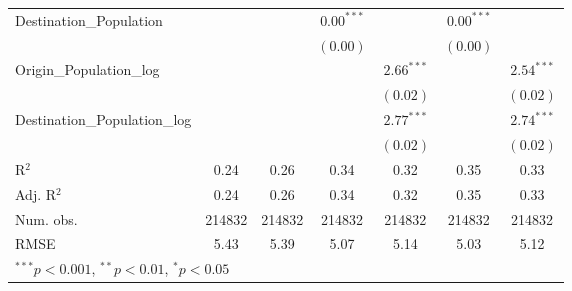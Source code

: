 \begin{table}
\begin{center}
\begin{tabular}{l c c c c c c }
			Destination\_Population      &               &               & $0.00^{***}$  &                & $0.00^{***}$  &                \\
			&               &               & $(0.00)$      &                & $(0.00)$      &                \\
			Origin\_Population\_log      &               &               &               & $2.66^{***}$   &               & $2.54^{***}$   \\
			&               &               &               & $(0.02)$       &               & $(0.02)$       \\
			Destination\_Population\_log &               &               &               & $2.77^{***}$   &               & $2.74^{***}$   \\
			&               &               &               & $(0.02)$       &               & $(0.02)$       \\
			\hline
			R$^2$                        & 0.24          & 0.26          & 0.34          & 0.32           & 0.35          & 0.33           \\
			Adj. R$^2$                   & 0.24          & 0.26          & 0.34          & 0.32           & 0.35          & 0.33           \\
			Num. obs.                    & 214832        & 214832        & 214832        & 214832         & 214832        & 214832         \\
			RMSE                         & 5.43          & 5.39          & 5.07          & 5.14           & 5.03          & 5.12           \\
			\hline
			\multicolumn{7}{l}{\scriptsize{$^{***}p<0.001$, $^{**}p<0.01$, $^*p<0.05$}}
		\end{tabular}
		\label{table:GravityModel2016Q1}
	\end{center}
\end{table}

